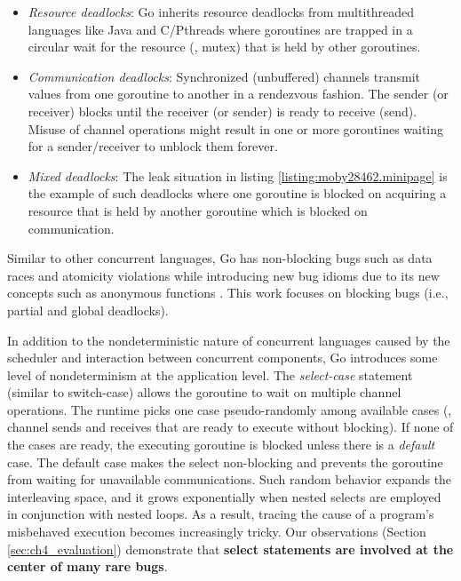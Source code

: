 \begin{itemize}
  \item \textit{Resource deadlocks}: Go inherits resource deadlocks from multithreaded languages like Java and C/Pthreads where goroutines are trapped in a circular wait for the resource (\eg, mutex) that is held by other goroutines.
  \item \textit{Communication deadlocks}: Synchronized (unbuffered) channels transmit values from one goroutine to another in a rendezvous fashion. The sender (or receiver) blocks until the receiver (or sender) is ready to receive (send). Misuse of channel operations might result in one or more goroutines waiting for a sender/receiver to unblock them forever.
  \item \textit{Mixed deadlocks}: The leak situation in listing \ref{listing:moby28462.minipage} is the example of such deadlocks where one goroutine is blocked on acquiring a resource that is held by another goroutine which is blocked on communication.
\end{itemize}

Similar to other concurrent languages, Go has non-blocking bugs such as data races and atomicity violations while introducing new bug idioms due to its new concepts such as anonymous functions \cite{tu-concurrentBugs-asplos19}.
%
This work focuses on blocking bugs (i.e., partial and global deadlocks).

In addition to the nondeterministic nature of concurrent languages caused by the scheduler and interaction between concurrent components, Go introduces some level of nondeterminism at the application level.
%
The \textit{select-case} statement (similar to switch-case) allows the goroutine to wait on multiple channel operations.
%
The runtime picks one case pseudo-randomly among available cases (\ie, channel sends and receives that are ready to execute without blocking).
%
If none of the cases are ready, the executing goroutine is blocked unless there is a \textit{default} case.
%
The default case makes the select non-blocking and prevents the goroutine from waiting for unavailable communications.
%
Such random behavior expands the interleaving space, and it grows exponentially when nested selects are employed in conjunction with nested loops.
%
As a result, tracing the cause of a program's misbehaved execution becomes increasingly tricky.
%
Our observations (Section \ref{sec:ch4_evaluation}) demonstrate that \textbf{select statements are involved at the center of many rare bugs}.


